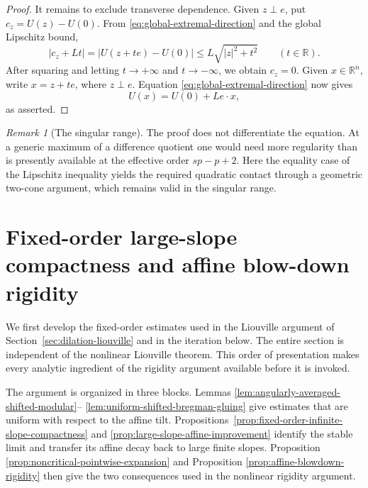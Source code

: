 \documentclass[11pt,reqno]{amsart}
\numberwithin{equation}{section}
\newcommand{\R}{\mathbb R}
\theoremstyle{remark}
\newtheorem{remark}[theorem]{Remark}
\begin{document}
\begin{proof}
It remains to exclude transverse dependence.  Given $z\perp e$, put
$c_z=U(z)-U(0)$.  From \eqref{eq:global-extremal-direction} and the
global Lipschitz bound,
\[
 |c_z+Lt|
 =|U(z+te)-U(0)|
 \le L\sqrt{|z|^2+t^2}
 \qquad(t\in\R).
\]
After squaring and letting $t\to+\infty$ and $t\to-\infty$, we obtain
$c_z=0$.  Given $x\in\R^n$, write $x=z+te$, where $z\perp e$.
Equation \eqref{eq:global-extremal-direction} now gives
\[
 U(x)=U(0)+Le\cdot x,
\]
as asserted.
\end{proof}

\begin{remark}[The singular range]
The proof does not differentiate the equation.  At a generic maximum of
a difference quotient one would need more regularity than is presently
available at the effective order $sp-p+2$.  Here the equality case of
the Lipschitz inequality yields the required quadratic contact through
a geometric two-cone argument, which remains valid in the singular
range.
\end{remark}

\section{Fixed-order large-slope compactness and affine blow-down rigidity}
\label{sec:large-slope-and-blowdown}

We first develop the fixed-order estimates used in the Liouville
argument of Section~\ref{sec:dilation-liouville} and in the iteration
below.  The entire section is independent of the nonlinear Liouville
theorem.  This order of presentation makes every analytic ingredient of the
rigidity argument available before it is invoked.

The argument is organized in three blocks.  Lemmas
\ref{lem:angularly-averaged-shifted-modular}--%
\ref{lem:uniform-shifted-bregman-gluing}
give estimates that are uniform with respect to the affine tilt.
Propositions~\ref{prop:fixed-order-infinite-slope-compactness} and
\ref{prop:large-slope-affine-improvement} identify the stable limit and
transfer its affine decay back to large finite slopes.  Proposition
\ref{prop:noncritical-pointwise-expansion} and Proposition
\ref{prop:affine-blowdown-rigidity} then give the two consequences used
in the nonlinear rigidity argument.
\end{document}
